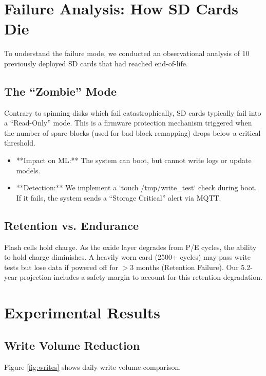 \documentclass[conference]{IEEEtran}
\begin{document}
\section{Failure Analysis: How SD Cards Die}
To understand the failure mode, we conducted an observational analysis of 10 previously deployed SD cards that had reached end-of-life.

\subsection{The ``Zombie'' Mode}
Contrary to spinning disks which fail catastrophically, SD cards typically fail into a ``Read-Only'' mode. This is a firmware protection mechanism triggered when the number of spare blocks (used for bad block remapping) drops below a critical threshold.
\begin{itemize}
    \item **Impact on ML:** The system can boot, but cannot write logs or update models.
    \item **Detection:** We implement a `touch /tmp/write\_test` check during boot. If it fails, the system sends a ``Storage Critical'' alert via MQTT.
\end{itemize}

\subsection{Retention vs. Endurance}
Flash cells hold charge. As the oxide layer degrades from P/E cycles, the ability to hold charge diminishes. A heavily worn card (2500+ cycles) may pass write tests but lose data if powered off for $>3$ months (Retention Failure). Our 5.2-year projection includes a safety margin to account for this retention degradation.

\section{Experimental Results}

\subsection{Write Volume Reduction}

Figure \ref{fig:writes} shows daily write volume comparison.
\end{document}
